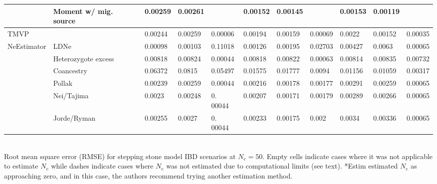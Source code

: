 \begin{landscape}
\begin{table}[h]
\begin{tabular}{ | l| p{2cm}|| l| l| l|| l| l| l|| l| l| l| }
 & Moment w/ mig. source & 0.00259 & 0.00261 &  & 0.00152 & 0.00145 &  & 0.00153 & 0.00119 &  \\ \hline
TMVP &  & 0.00244 & 0.00259 & 0.00006 & 0.00194 & 0.00159 & 0.00069 & 0.0022 & 0.00152 & 0.00035 \\ \hline
NeEstimator & LDNe & 0.00098 & 0.00103 & 0.11018 & 0.00126 & 0.00195 & 0.02703 & 0.00427 & 0.0063 & 0.00065 \\ \hline
 & Heterozygote excess & 0.00818 & 0.00824 & 0.00044 & 0.00818 & 0.00822 & 0.00063 & 0.00814 & 0.00835 & 0.00732 \\ \hline
 & Coancestry & 0.06372 & 0.0815 & 0.05497 & 0.01575 & 0.01777 & 0.0094 & 0.01156 & 0.01059 & 0.00317 \\ \hline
 & Pollak & 0.00239 & 0.00259 & 0.00044 & 0.00216 & 0.00178 & 0.00177 & 0.00291 & 0.00259 & 0.00065 \\ \hline
 & Nei/Tajima & 0.0023 & 0.00248 & 0. 00044 & 0.00207 & 0.00171 & 0.00179 & 0.00289 & 0.00266 & 0.00065 \\ \hline
 & Jorde/Ryman & 0.00255 & 0.0027 & 0. 00044 & 0.00233 & 0.00175 & 0.002 & 0.0034 & 0.00336 & 0.00065 \\ \hline 
\end{tabular}
\bigskip{}
{\footnotesize \\ Root mean square error (RMSE) for stepping stone model IBD scenarios at $N_e = 50$. Empty cells indicate cases where it was not applicable to estimate $N_e$ while dashes indicate cases where $N_e$ was not estimated due to computational limits (see text). *Estim estimated $N_e$ as approaching zero, and in this case, the authors recommend trying another estimation method.}
\end{table}



\end{landscape}
